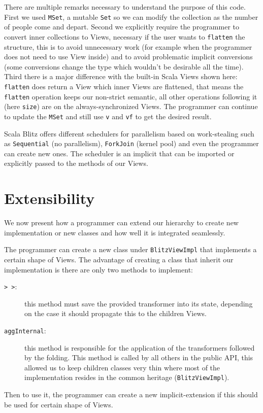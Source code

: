 \documentclass[a4paper,12pt,twocolumn]{article}
\begin{document}
There are multiple remarks necessary to understand the purpose of this code.
First we used \verb|MSet|, a mutable \verb|Set| so we can modify the collection as the number of people come and depart.
Second we explicitly require the programmer to convert inner collections to Views, necessary if the user wants to \verb|flatten| the structure, this is to avoid unnecessary work (for example when the programmer does not need to use View inside) and to avoid problematic implicit conversions (some conversions change the type which wouldn't be desirable all the time).
Third there is a major difference with the built-in Scala Views shown here: \verb|flatten| does return a View which inner Views are flattened, that means the \verb|flatten| operation keeps our non-strict semantic, all other operations following it (here \verb|size|) are on the always-synchronized Views.
The programmer can continue to update the \verb|MSet| and still use \verb|v| and \verb|vf| to get the desired result.

Scala Blitz offers different schedulers for parallelism based on work-stealing such as \verb|Sequential| (no parallelism), \verb|ForkJoin| (kernel pool) and even the programmer can create new ones.
The scheduler is an implicit that can be imported or explicitly passed to the methods of our Views.


\section{Extensibility}
\label{sec:ext}
We now present how a programmer can extend our hierarchy to create new implementation or new classes and how well it is integrated seamlessly.

The programmer can create a new class under \verb|BlitzViewImpl| that implements a certain shape of Views.
The advantage of creating a class that inherit our implementation is there are only two methods to implement:
\begin{description}
    \item[{\tt >\,>}:] this method must save the provided transformer into its state, depending on the case it should propagate this to the children Views.
    \item[{\tt aggInternal}:] this method is responsible for the application of the transformers followed by the folding.
        This method is called by all others in the public API, this allowed us to keep children classes very thin where most of the implementation resides in the common heritage (\verb|BlitzViewImpl|).
\end{description}
Then to use it, the programmer can create a new implicit-extension if this should be used for certain shape of Views.
\end{document}
